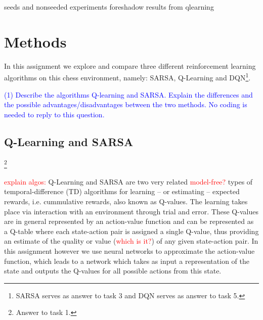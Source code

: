\documentclass[conference]{IEEEtran}
\begin{document}
seeds and nonseeded experiments foreshadow results from qlearning



\section{Methods}\label{sec:methods}



In this assignment we explore and compare three different reinforcement learning algorithms on this chess environment, namely: SARSA, Q-Learning and DQN\footnote{SARSA serves as answer to task 3 and DQN serves as answer to task 5.}.

\textcolor{blue}{(1) Describe the algorithms Q-learning and SARSA. Explain the differences and the possible advantages/disadvantages between the two methods. No coding is needed to reply to this question.}

\subsection{Q-Learning and SARSA}

\footnote{Answer to task 1.}

\textcolor{red}{explain algos: }Q-Learning and SARSA are two very related \textcolor{red}{model-free?} types of temporal-difference (TD) algorithms for learning -- or estimating -- expected rewards, i.e. cummulative rewards, also known as Q-values. The learning takes place via interaction with an environment through trial and error. These Q-values are in general represented by an action-value function and can be represented as a Q-table where each state-action pair is assigned a single Q-value, thus providing an estimate of the quality or value (\textcolor{red}{which is it?}) of any given state-action pair. In this assignment however we use neural networks to approximate the action-value function, which leads to a network which takes as input a representation of the state and outputs the Q-values for all possible actions from this state.
\end{document}
